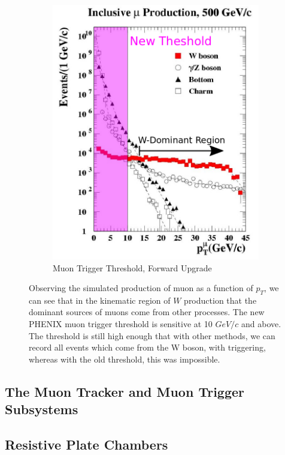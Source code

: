 \begin{figure}[ht]
\begin{subfigure}[b]{0.5\textwidth}
    \includegraphics[width=\textwidth]{./figures/w_dominant_region_new_trigger.png}
    \caption{Muon Trigger Threshold, Forward Upgrade}
    \label{fig:trig_muon_new}
  \end{subfigure}
  \caption{ 
    Observing the simulated production of muon as a function of $p_T$, we can
    see that in the kinematic region of $W$ production that the dominant sources
    of muons come from other processes. The new PHENIX muon trigger threshold is
    sensitive at 10 $GeV/c$ and above. The threshold is still high enough that
    with other methods, we can record all events which come from the W boson,
    with triggering, whereas with the old threshold, this was impossible.
  }
  \label{fig:muon_production_vs_pt}
\end{figure}

\subsection{The Muon Tracker and Muon Trigger Subsystems}
\subsection{Resistive Plate Chambers}
